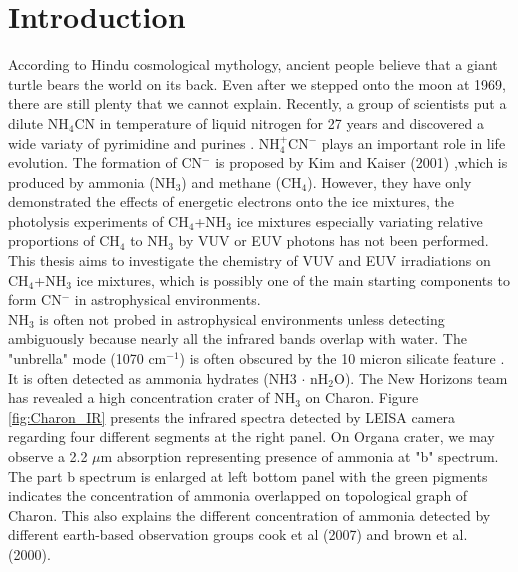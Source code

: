 \chapter{\protect Introduction}
\label{introduction}

According to Hindu cosmological mythology, ancient people believe that a giant turtle bears the world on its back. Even after we stepped onto the moon at 1969, there are still plenty that we cannot explain. Recently, a group of scientists put a dilute NH$_4$CN in temperature of liquid nitrogen for 27 years and discovered a wide variaty of pyrimidine and purines \cite{miyakawa2002cold}. NH$_4^+$CN$^-$ plays an important role in life evolution. The formation of CN$^-$ is proposed by Kim and Kaiser (2001) \cite{kim},which is produced by ammonia (NH$_3$) and methane (CH$_4$). However, they have only demonstrated the effects of energetic electrons onto the ice mixtures, the photolysis experiments of CH$_4$+NH$_3$ ice mixtures especially variating relative proportions of CH$_4$ to NH$_3$ by VUV or EUV photons has not been performed. This thesis aims to investigate the chemistry of VUV and EUV irradiations on CH$_4$+NH$_3$ ice mixtures, which is possibly one of the main starting components to form CN$^-$ in astrophysical environments.\\

NH$_3$ is often not probed in astrophysical environments unless detecting ambiguously because nearly all the infrared bands overlap with water. The "unbrella" mode (1070 cm$^{-1}$) is often obscured by the 10 micron silicate feature \cite{d1986time}. It is often detected as ammonia hydrates (NH3 $\cdot$ nH$_2$O)\cite{cook2007near}. The New Horizons team has revealed a high concentration crater of NH$_3$ on Charon\cite{grundy2016surface}. Figure \ref{fig:Charon_IR} presents the infrared spectra detected by LEISA camera regarding four different segments at the right panel. On Organa crater, we may observe a 2.2 $\mu$m absorption representing presence of ammonia at "b" spectrum. The part b spectrum is enlarged at left bottom panel with the green pigments indicates the concentration of ammonia overlapped on topological graph of Charon. This also explains the different concentration of ammonia detected by different earth-based observation groups cook et al (2007)\cite{cook2007near} and brown et al. (2000)\cite{brown2000evidence}.\\

